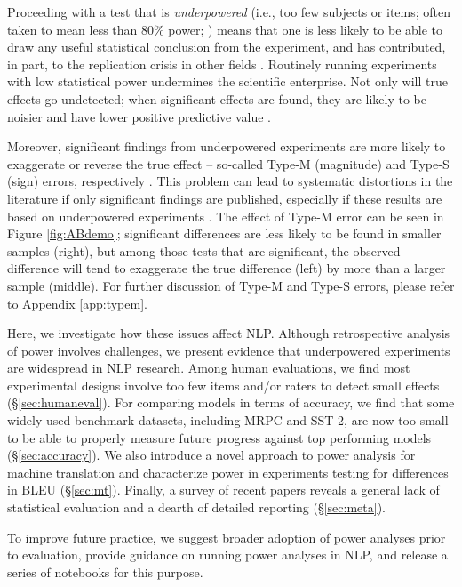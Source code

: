 \documentclass[11pt,a4paper]{article}
\begin{document}
Proceeding with a test that is \emph{underpowered} (i.e., too few subjects or items; often taken to mean less than 80\% power; \citealp{cohen_statistical_1962}) means that one is less likely to be able to draw any useful statistical conclusion from the experiment,
and has contributed, in part, to the replication crisis in other fields \citep{button2013power,szucs2017empirical,ioannidis.2017}. 
Routinely
running experiments with low statistical power
undermines the scientific enterprise.
Not only
will true effects go undetected;
when
significant effects
are found,
they are likely to
be noisier
and 
have lower positive predictive value \citep{button2013power}.

Moreover, significant findings from underpowered experiments 
are more likely to exaggerate or reverse the true effect -- so-called Type-M (magnitude) and Type-S (sign) errors, respectively \citep{gelman2014beyond}.
This problem can lead to systematic distortions in the literature if only significant findings are published, especially if these results are based on underpowered experiments \citep{scargle.1999}. The effect of Type-M error can be seen in Figure \ref{fig:ABdemo}; significant differences are less likely to be found in smaller samples (right), but among those tests that are significant, the observed difference will tend to exaggerate the true difference (left) by more than a larger sample (middle). For further discussion of Type-M and Type-S errors, please refer to Appendix \ref{app:typem}.

Here, we investigate how these issues affect NLP. 
Although retrospective analysis of power involves challenges, we present evidence that underpowered experiments are widespread in NLP research. Among human evaluations, we find most experimental designs involve too few items and/or raters to detect small effects (\S\ref{sec:humaneval}). For comparing models in terms of accuracy, we find that some widely used benchmark datasets, including MRPC and SST-2, are now too small to be able to properly measure future progress against top performing models (\S\ref{sec:accuracy}). We also introduce a novel approach to power analysis for machine translation and characterize power in experiments testing for differences in BLEU (\S\ref{sec:mt}).
Finally, a survey of recent papers reveals a general lack of statistical evaluation and a dearth of detailed reporting (\S\ref{sec:meta}).


To improve future practice, we suggest broader adoption of power analyses prior to evaluation, provide guidance on running power analyses in NLP, and
release a series of notebooks for this purpose. 
\end{document}
